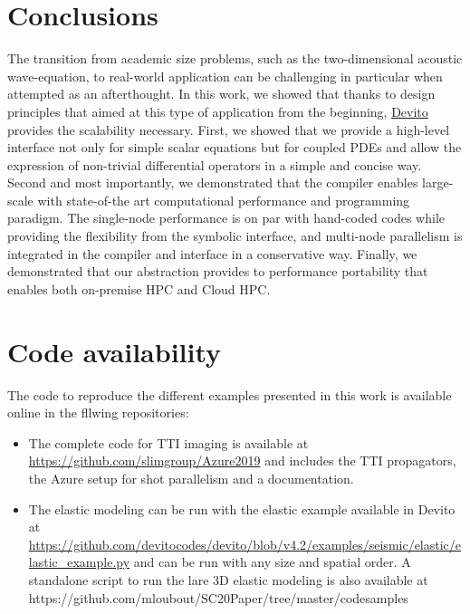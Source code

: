 \documentclass[conference]{IEEEtran}
\begin{document}
\section{Conclusions}\label{conclusions}

The transition from academic size problems, such as the two-dimensional
acoustic wave-equation, to real-world application can be challenging in
particular when attempted as an afterthought. In this work, we showed that
thanks to design principles that aimed at this type of application from
the beginning, \href{https://github.com/devitocodes/devito}{Devito} provides the scalability necessary. First, we showed
that we provide a high-level interface not only for simple scalar
equations but for coupled PDEs and allow the expression of non-trivial
differential operators in a simple and concise way. Second and most
importantly, we demonstrated that the compiler enables large-scale with
state-of-the art computational performance and programming paradigm. The
single-node performance is on par with hand-coded codes while providing
the flexibility from the symbolic interface, and multi-node parallelism is
integrated in the compiler and interface in a conservative way. Finally,
we demonstrated that our abstraction provides to performance portability
that enables both on-premise HPC and Cloud HPC.


\section{Code availability}

The code to reproduce the different examples presented in this work is available online in the fllwing repositories:

\begin{itemize}
  \item The complete code for TTI imaging is available at \url{https://github.com/slimgroup/Azure2019} and includes 
  the TTI propagators, the Azure setup for shot parallelism and a documentation.
  \item The elastic modeling can be run with the elastic example available in Devito at
  \url{https://github.com/devitocodes/devito/blob/v4.2/examples/seismic/elastic/elastic_example.py} 
  and can be run with any size and spatial order. A standalone script to run the lare 3D elastic modeling
  is also available at {https://github.com/mloubout/SC20Paper/tree/master/codesamples}
\end{itemize}


\end{document}
